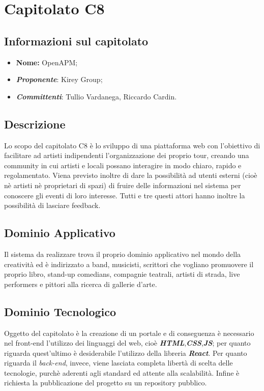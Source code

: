 \section{Capitolato C8}
\subsection{Informazioni sul capitolato}
	\begin{itemize}
		\item \textbf{Nome:}
		OpenAPM;
		\item \textbf{\textit{Proponente}}:
		Kirey Group;
		\item \textbf{\textit{Committenti}}:
		Tullio Vardanega, Riccardo Cardin.
	\end{itemize}

\subsection{Descrizione}
	Lo scopo del capitolato C8 è lo sviluppo di una piattaforma web con l'obiettivo di facilitare ad artisti indipendenti l'organizzazione dei proprio tour, creando una community in cui artisti e locali possano interagire in modo chiaro, rapido e regolamentato. 
	Viena previsto inoltre di dare la possibilità ad utenti esterni (cioè nè artisti nè proprietari di spazi) di fruire delle informazioni nel sistema per conoscere gli eventi di loro interesse. Tutti e tre questi attori hanno inoltre la possibilità di lasciare feedback.
	
\subsection{Dominio Applicativo}
	Il sistema da realizzare trova il proprio dominio applicativo nel mondo della creatività ed è indirizzato a band, musicisti, scrittori che vogliano promuovere
	il proprio libro, stand-up comedians, compagnie teatrali, artisti di strada, live
	performers e pittori alla ricerca di gallerie d’arte.

\subsection{Dominio Tecnologico}
	Oggetto del capitolato è la creazione di un portale e di conseguenza è necessario nel front-end l'utilizzo dei linguaggi del web, cioè \textit{\textbf{HTML}},\textit{\textbf{CSS}},\textit{\textbf{JS}}; per quanto riguarda quest'ultimo è desiderabile l'utilizzo della libreria \textit{\textbf{React}}. Per quanto riguarda il \textit{back-end}, invece, viene lasciata completa libertà di scelta delle tecnologie, purchè aderenti agli standard ed attente alla scalabilità.
	Infine è richiesta la pubblicazione del progetto su un repository pubblico.

